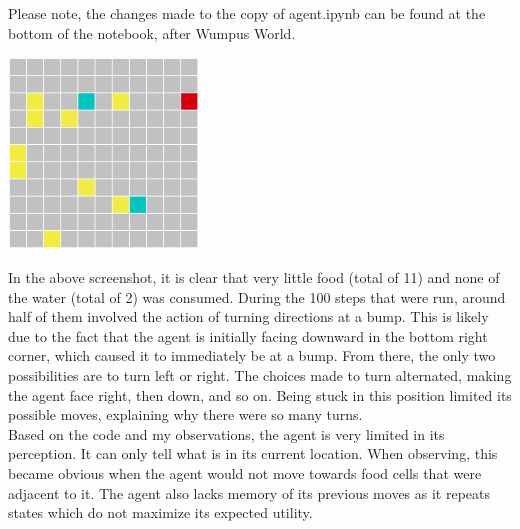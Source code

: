 \documentclass{article}
\begin{document}
    \section{}
        Please note, the changes made to the copy of agent.ipynb can be found at the bottom of the notebook, after Wumpus World.\\
            \begin{center}\includegraphics[width = 2in, height = 2in]{step_6.png}\end{center}

        In the above screenshot, it is clear that very little food (total of 11) and none of the water (total of 2) was consumed. During the 100 steps that were run, around half of them involved the action of turning directions at a bump. This is likely due to the fact that the agent is initially facing downward in the bottom right corner, which caused it to immediately be at a bump. From there, the only two possibilities are to turn left or right. The choices made to turn alternated, making the agent face right, then down, and so on. Being stuck in this position limited its possible moves, explaining why there were so many turns. \\

        Based on the code and my observations, the agent is very limited in its perception. It can only tell what is in its current location. When observing, this became obvious when the agent would not move towards food cells that were adjacent to it. The agent also lacks memory of its previous moves as it repeats states which do not maximize its expected utility.\\[0.7in]
\end{document}
